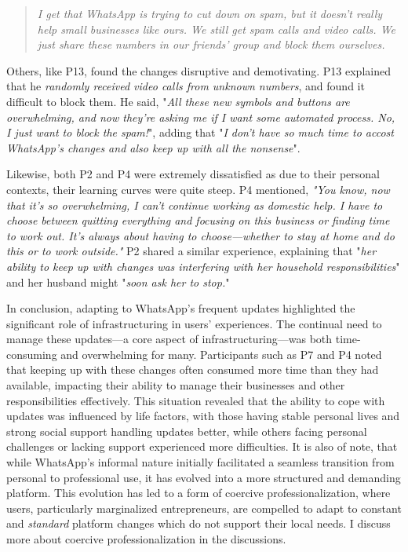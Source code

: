 \begin{quote}
    \textit{I get that WhatsApp is trying to cut down on spam, but it doesn't really help small businesses like ours. We still get spam calls and video calls. We just share these numbers in our friends' group and block them ourselves.}
\end{quote}



Others, like P13, found the changes disruptive and demotivating. P13 explained that he \textit{randomly received video calls from unknown numbers}, and found it difficult to block them. He said, "\textit{All these new symbols and buttons are overwhelming, and now they're asking me if I want some automated process. No, I just want to block the spam!}", adding that "\textit{I don't have so much time to accost WhatsApp's changes and also keep up with all the nonsense}".

Likewise, both P2 and P4 were extremely dissatisfied as due to their personal contexts, their learning curves were quite steep. P4 mentioned, \textit{"You know, now that it’s so overwhelming, I can’t continue working as domestic help. I have to choose between quitting everything and focusing on this business or finding time to work out. It’s always about having to choose—whether to stay at home and do this or to work outside."} P2 shared a similar experience, explaining that "\textit{her ability to keep up with changes was interfering with her household responsibilities}" and her husband might "\textit{soon ask her to stop.}"


In conclusion, adapting to WhatsApp’s frequent updates highlighted the significant role of infrastructuring in users’ experiences. The continual need to manage these updates—a core aspect of infrastructuring—was both time-consuming and overwhelming for many. Participants such as P7 and P4 noted that keeping up with these changes often consumed more time than they had available, impacting their ability to manage their businesses and other responsibilities effectively. This situation revealed that the ability to cope with updates was influenced by life factors, with those having stable personal lives and strong social support handling updates better, while others facing personal challenges or lacking support experienced more difficulties. It is also of note, that while WhatsApp's informal nature initially facilitated a seamless transition from personal to professional use, it has evolved into a more structured and demanding platform. This evolution has led to a form of coercive professionalization, where users, particularly marginalized entrepreneurs, are compelled to adapt to constant and \textit{standard} platform changes which do not support their local needs. I discuss more about coercive professionalization in the discussions.

